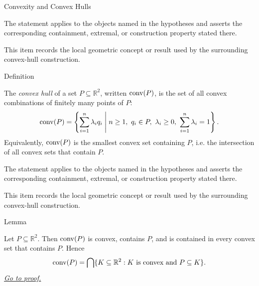 \begin{topicbox}{Convexity and Convex Hulls}
\begin{remark*}
The statement applies to the objects named in the hypotheses and asserts the
corresponding containment, extremal, or construction property stated there.
\end{remark*}

\begin{remark*}[Interpretation]
This item records the local geometric concept or result used by the surrounding
convex-hull construction.
\end{remark*}

\DefinitionalRoot

\begin{definitionbox}{Definition}
\begin{definition}
\label{def:computational-geometry-convex-hull}
The \emph{convex hull} of a set \(P\subseteq\mathbb{R}^2\), written
\(\operatorname{conv}(P)\), is the set of all convex combinations of finitely many points of
\(P\):
\[
  \operatorname{conv}(P)
  =
  \left\{
    \sum_{i=1}^{n}\lambda_i q_i
    \;\middle|\;
    n\ge 1,\ q_i\in P,\ \lambda_i\ge 0,\ \sum_{i=1}^{n}\lambda_i=1
  \right\}.
\]
Equivalently, \(\operatorname{conv}(P)\) is the smallest convex set containing \(P\), i.e. the
intersection of all convex sets that contain \(P\).
\end{definition}
\end{definitionbox}

\begin{remark*}
The statement applies to the objects named in the hypotheses and asserts the
corresponding containment, extremal, or construction property stated there.
\end{remark*}

\begin{remark*}[Interpretation]
This item records the local geometric concept or result used by the surrounding
convex-hull construction.
\end{remark*}

\DefinitionalRoot

\begin{lemmabox}{Lemma}
\begin{lemma}
\label{lem:computational-geometry-convex-hull-smallest-convex-set}
Let \(P\subseteq\mathbb{R}^2\). Then \(\operatorname{conv}(P)\) is convex, contains \(P\), and
is contained in every convex set that contains \(P\). Hence
\[
  \operatorname{conv}(P)
  =
  \bigcap\{K\subseteq\mathbb{R}^2 : K\text{ is convex and }P\subseteq K\}.
\]
\hyperref[prf:computational-geometry-convex-hull-smallest-convex-set]{\textit{Go to proof.}}
\end{lemma}
\end{lemmabox}


\end{topicbox}
